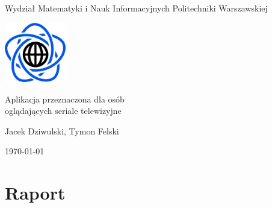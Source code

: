 \documentclass[10pt,a4paper]{article}
\begin{document}
\begin{titlepage}
\centering
{\Large Wydział Matematyki i Nauk Informacyjnych Politechniki Warszawskiej \par}
\vspace{1cm}
\includegraphics[width=0.2\textwidth]{Resources/Images/logo.png} \par
\vspace{5cm}
{\LARGE Aplikacja przeznaczona dla osób\\oglądających seriale telewizyjne \par}
\vspace{0.5cm}
{\Large Jacek Dziwulski, Tymon Felski \par}
\vspace{1.5cm}
{\Large \today \par}
\end{titlepage}

\newpage
\tableofcontents

\newpage
\section{Raport}
\end{document}
